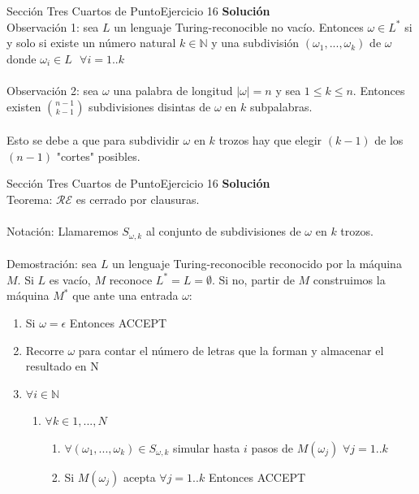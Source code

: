 \documentclass[10pt, envcountsect, presentation, aspectratio=169]{beamer}
\begin{document}

\begin{frame}{Sección Tres Cuartos de Punto}{Ejercicio 16}
    \textbf{Solución}\\
    Observación 1: sea $L$ un lenguaje Turing-reconocible no vacío. 
    Entonces $\omega \in L^*$ si y solo si existe un número natural $k \in \mathbb{N}$ y una subdivisión $(\omega_1,...,\omega_k)$ de $\omega$ donde $\omega_i \in L \text{ } \forall i = 1..k$\\~\\

    Observación 2: sea $\omega$ una palabra de longitud $|\omega|=n$ y sea $1 \leq k \leq n$.
    Entonces existen ${n-1}\choose{k-1}$ subdivisiones disintas de $\omega$ en $k$ subpalabras.\\~\\

    Esto se debe a que para subdividir $\omega$ en $k$ trozos hay que elegir $(k-1)$ de los $(n-1)$ "cortes" posibles.
\end{frame}


\begin{frame}{Sección Tres Cuartos de Punto}{Ejercicio 16}
    \textbf{Solución}\\
    Teorema: $\mathcal{RE}$ es cerrado por clausuras.\\~\\
    Notación: Llamaremos $S_{\omega, k}$ al conjunto de subdivisiones de $\omega$ en $k$ trozos.\\~\\ 
    Demostración: sea $L$ un lenguaje Turing-reconocible reconocido por la máquina $M$. Si $L$ es vacío, $M$ reconoce $L^*=L=\emptyset$. Si no, partir de $M$ construimos la máquina $M^*$ que ante una entrada $\omega$:
    \begin{enumerate}
        \item Si $\omega = \epsilon$ Entonces ACCEPT 
        \item Recorre $\omega$ para contar el número de letras que la forman y almacenar el resultado en N
        \item $\forall i \in \mathbb{N}$
        \begin{enumerate}
            \item $\forall k \in {1,...,N}$
            \begin{enumerate}
                \item $\forall (\omega_1,...,\omega_k) \in S_{\omega, k}$ simular hasta $i$ pasos de $M(\omega_j)$ $\forall j=1..k$
                \item Si $M(\omega_j)$ acepta $\forall j=1..k$ Entonces ACCEPT
            \end{enumerate}
        \end{enumerate}
    \end{enumerate}
\end{frame}
\end{document}
